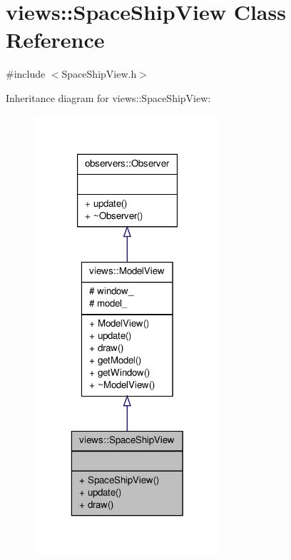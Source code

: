 \hypertarget{classviews_1_1SpaceShipView}{\section{views\-:\-:\-Space\-Ship\-View \-Class \-Reference}
\label{d7/d5c/classviews_1_1SpaceShipView}
}


{\ttfamily \#include $<$\-Space\-Ship\-View.\-h$>$}



\-Inheritance diagram for views\-:\-:\-Space\-Ship\-View\-:\nopagebreak
\begin{figure}[H]
\begin{center}
\leavevmode
\includegraphics[width=196pt]{d9/d4d/classviews_1_1SpaceShipView__inherit__graph}
\end{center}
\end{figure}


